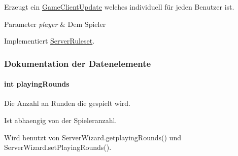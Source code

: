 Erzeugt ein \hyperlink{a00059}{Game\-Client\-Update} welches individuell für jeden Benutzer ist. 


\begin{DoxyParams}{Parameter}
{\em player} & Dem Spieler \\
\hline
\end{DoxyParams}


Implementiert \hyperlink{a00068_a4bc36d254178bf54e75fcdf472a5f863}{Server\-Ruleset}.



\subsubsection{Dokumentation der Datenelemente}
\hypertarget{a00069_afdd09d28760a65b79bafdb1551e30585}{
\paragraph[{playing\-Rounds}]{\setlength{\rightskip}{0pt plus 5cm}int playing\-Rounds\hspace{0.3cm}{\ttfamily [private]}}}\label{a00069_afdd09d28760a65b79bafdb1551e30585}


Die Anzahl an Runden die gespielt wird. 

Ist abhaengig von der Spieleranzahl. 

Wird benutzt von Server\-Wizard.\-getplaying\-Rounds() und Server\-Wizard.\-set\-Playing\-Rounds().

